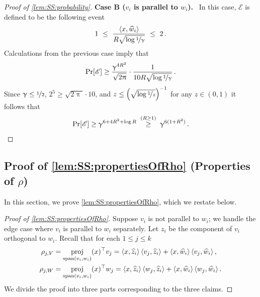 \documentclass[11pt,letterpaper]{article}
\DeclareMathOperator{\proj}{proj}
\theoremstyle{plain}
\theoremstyle{definition}
\theoremstyle{remark}
\newcommand{\Stackrel}[2]{\stackrel{\mathmakebox[\widthof{\ensuremath{#2}}]{#1}}{#2}}
\newcommand{\sinangle}[1]{\ensuremath{\langle#1\rangle}}
\newcommand{\inparen}[1]{\ensuremath{\left(#1\right)}}
\newcommand{\inangle}[1]{\left\langle#1\right\rangle}
\newcommand{\evE}{\ensuremath{\mathscr{E}}}
\newcommand{\nfrac}[2]{\nicefrac{#1}{#2}}
\newcommand{\wh}[1]{\widehat{#1}}
\renewcommand{\paragraph}[1]{\medskip \noindent\textbf{#1}~}
\renewcommand{\gamma}{\upgamma}
\renewcommand{\pi}{\uppi}
\begin{document}
{{{\begin{proof}[Proof of \cref{lem:SS:probability}]
                \paragraph{Case B ($v_i$ is parallel to $w_i$).}
                    In this case, $\evE$ is defined to be the following event
                    \[
                        1 ~\leq~ 
                        \frac{\inangle{x, \wh{w}_i}}{
                            R\sqrt{\log{\nfrac{1}{\gamma}}}
                        }
                        ~\leq~ 2\,.
                    \]
                    Calculations from the previous case imply that 
                    \[
                        \Pr[\evE]
                        \geq 
                        \frac{\gamma^{4R^2}}{\sqrt{2\pi}}\cdot \frac{1}{10R\sqrt{\log{\nfrac{1}{\gamma}}}}\,.
                    \]
                    Since $\gamma \leq \nfrac{1}{2}$, $2^5\geq \sqrt{2\pi}\cdot 10$, and $z\leq \inparen{\sqrt{\log{\nfrac{1}{z}}}}^{-1}$ for any $z\in (0,1)$ it follows that 
                    \[
                        \Pr[\evE]
                        \geq 
                        \gamma^{6+4R^2+\log{R}}
                        ~~~\Stackrel{(R\geq 1)}{\geq}~~~
                        \gamma^{6(1+R^2)}\,.
                    \]
                    
            \end{proof}

        
        \subsection{Proof of \cref{lem:SS:propertiesOfRho} (Properties of $\rho$)}
            \label{sec:proofof:lem:SS:propertiesOfRho}
            
            In this section, we prove \cref{lem:SS:propertiesOfRho}, which we restate below.
            \lemSSpropertiesOfRho*
            \begin{proof}[Proof of \cref{lem:SS:propertiesOfRho}]    
                Suppose $v_i$ is not parallel to $w_i$; we handle the edge case where $v_i$ is parallel to $w_i$ separately.
                Let $z_i$ be the component of $v_i$ orthogonal to $w_i$.
                Recall that for each $1\leq j\leq k$
                \begin{align*}
                    \rho_{j,V}
                    &= \proj_{{\rm span}(v_i,w_i)}(x)^\top v_j 
                    = 
                    \inangle{x,\wh{z}_i} \sinangle{v_j,\wh{z}_i}
                    +
                    \inangle{x,\wh{w}_i} \sinangle{v_j,\wh{w}_i}\,,\\
                    \rho_{j,W}
                    &= \proj_{{\rm span}(v_i,w_i)}(x)^\top w_j 
                    = 
                    \inangle{x,\wh{z}_i} \sinangle{w_j,\wh{z}_i}
                    +
                    \inangle{x,\wh{w}_i} \sinangle{w_j,\wh{w}_i}\,.
                \end{align*}
            We divide the proof into three parts corresponding to the three claims.
            

\end{proof}}}}
\end{document}
